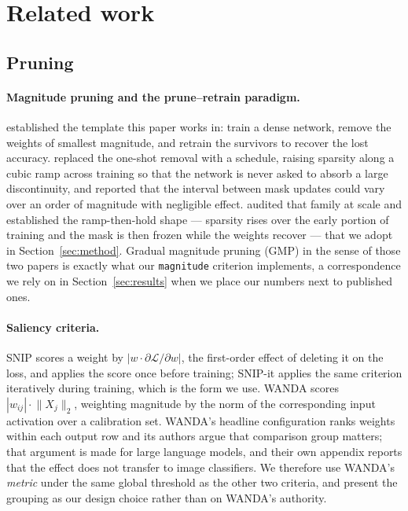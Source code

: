 \section{Related work}
\label{sec:related}

\subsection{Pruning}

\paragraph{Magnitude pruning and the prune--retrain paradigm.}
\citet{han2015learning} established the template this paper works in: train a
dense network, remove the weights of smallest magnitude, and retrain the survivors
to recover the lost accuracy. \citet{zhu2018prune} replaced the one-shot removal
with a schedule, raising sparsity along a cubic ramp across training so that the
network is never asked to absorb a large discontinuity, and reported that the
interval between mask updates could vary over an order of magnitude with
negligible effect. \citet{gale2019state} audited that family at scale and
established the ramp-then-hold shape --- sparsity rises over the early portion of
training and the mask is then frozen while the weights recover --- that we adopt
in Section~\ref{sec:method}. Gradual magnitude pruning (GMP) in the sense of
those two papers is exactly what our \texttt{magnitude} criterion implements, a
correspondence we rely on in Section~\ref{sec:results} when we place our numbers
next to published ones.

\paragraph{Saliency criteria.}
SNIP \citep{lee2019snip} scores a weight by $|w \cdot \partial\mathcal{L}/\partial w|$,
the first-order effect of deleting it on the loss, and applies the score once
before training; SNIP-it \citep{verdenius2020snipit} applies the same criterion
iteratively during training, which is the form we use. WANDA
\citep{sun2024wanda} scores $|w_{ij}| \cdot \lVert X_j \rVert_2$, weighting
magnitude by the norm of the corresponding input activation over a calibration
set. WANDA's headline configuration ranks weights within each output row and its
authors argue that comparison group matters; that argument is made for large
language models, and their own appendix reports that the effect does not transfer
to image classifiers. We therefore use WANDA's \emph{metric} under the same
global threshold as the other two criteria, and present the grouping as our
design choice rather than on WANDA's authority.

